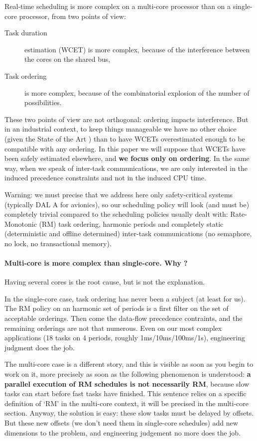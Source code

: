 \documentclass[a4paper]{article}
\begin{document}
Real-time scheduling is more complex on a multi-core processor than on a single-core processor, from two points of view:
\begin{description}
\item[Task duration]
estimation (WCET) is more complex, because of the interference between the cores on the shared bus,
\item[Task ordering]
is more complex, because of the combinatorial explosion of the number of possibilities.
\end{description}
These two points of view are not orthogonal: ordering impacts interference.
But in an industrial context, to keep things manageable we have no other choice (given the State of the Art \cite{DBLP:journals/csur/MaizaRRGAD19})
than to have WCETs overestimated enough to be compatible with any ordering.
In this paper we will suppose that WCETs have been safely estimated elsewhere,
and \textbf{we focus only on ordering}.
In the same way, when we speak of inter-task communications, we are only interested in the induced precedence constraints
and not in the induced CPU time.

Warning: we must precise that we address here only safety-critical systems (typically DAL A for avionics),
so our scheduling policy will look (and must be) completely trivial
compared to the scheduling policies usually dealt with: Rate-Monotonic (RM) task ordering, harmonic periods and completely static (deterministic and offline determined)
inter-task communications (no semaphore, no lock, no transactional memory).

\paragraph*{Multi-core is more complex than single-core. Why ?}

Having several cores is the root cause, but is not the explanation.

In the single-core case, task ordering has never been a subject (at least for us).
The RM policy on an harmonic set of periods is a first filter on the set of acceptable orderings.
Then come the data-flow precedence contraints, and the remaining orderings are not that numerous.
Even on our most complex applications (18 tasks on 4 periods, roughly 1ms/10ms/100ms/1s), engineering judgment does the job.

The multi-core case is a different story, and this is visible as soon as you begin to work on it, more precisely as soon as the following phenomenon is understood:
\textbf{a parallel execution of RM schedules is not necessarily RM},
because slow tasks can start before fast tasks have finished.
This sentence relies on a specific definition of `RM' in the multi-core context, it will be precised in the multi-core section.
Anyway, the solution is easy: these slow tasks must be delayed by offsets.
But these new offsets (we don't need them in single-core schedules) add new dimensions to the problem,
and engineering judgement no more does the job.
\end{document}
